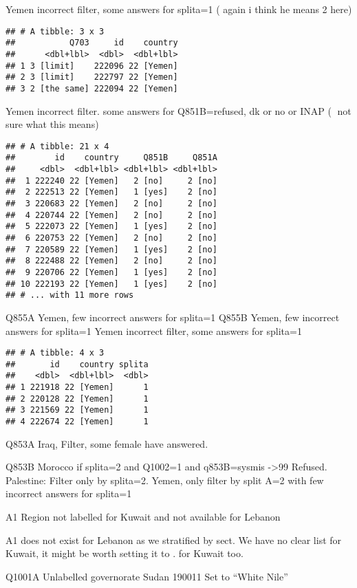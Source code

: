 \documentclass[]{article}
\begin{document}
Yemen incorrect filter, some answers for splita=1 ( again i think he
means 2 here)

\begin{verbatim}
## # A tibble: 3 x 3
##           Q703     id    country
##      <dbl+lbl>  <dbl>  <dbl+lbl>
## 1 3 [limit]    222096 22 [Yemen]
## 2 3 [limit]    222797 22 [Yemen]
## 3 2 [the same] 222094 22 [Yemen]
\end{verbatim}

Yemen incorrect filter. some answers for Q851B=refused, dk or no or INAP
( not sure what this means)

\begin{verbatim}
## # A tibble: 21 x 4
##        id    country     Q851B     Q851A
##     <dbl>  <dbl+lbl> <dbl+lbl> <dbl+lbl>
##  1 222240 22 [Yemen]   2 [no]     2 [no]
##  2 222513 22 [Yemen]   1 [yes]    2 [no]
##  3 220683 22 [Yemen]   2 [no]     2 [no]
##  4 220744 22 [Yemen]   2 [no]     2 [no]
##  5 222073 22 [Yemen]   1 [yes]    2 [no]
##  6 220753 22 [Yemen]   2 [no]     2 [no]
##  7 220589 22 [Yemen]   1 [yes]    2 [no]
##  8 222488 22 [Yemen]   2 [no]     2 [no]
##  9 220706 22 [Yemen]   1 [yes]    2 [no]
## 10 222193 22 [Yemen]   1 [yes]    2 [no]
## # ... with 11 more rows
\end{verbatim}

Q855A Yemen, few incorrect answers for splita=1 Q855B Yemen, few
incorrect answers for splita=1 Yemen incorrect filter, some answers for
splita=1

\begin{verbatim}
## # A tibble: 4 x 3
##       id    country splita
##    <dbl>  <dbl+lbl>  <dbl>
## 1 221918 22 [Yemen]      1
## 2 220128 22 [Yemen]      1
## 3 221569 22 [Yemen]      1
## 4 222674 22 [Yemen]      1
\end{verbatim}

Q853A Iraq, Filter, some female have answered.

Q853B Morocco if splita=2 and Q1002=1 and q853B=sysmis -\textgreater{}99
Refused. Palestine: Filter only by splita=2. Yemen, only filter by split
A=2 with few incorrect answers for splita=1

A1 Region not labelled for Kuwait and not available for Lebanon

A1 does not exist for Lebanon as we stratified by sect. We have no clear
list for Kuwait, it might be worth setting it to . for Kuwait too.

Q1001A Unlabelled governorate Sudan 190011 Set to ``White Nile''
\end{document}
